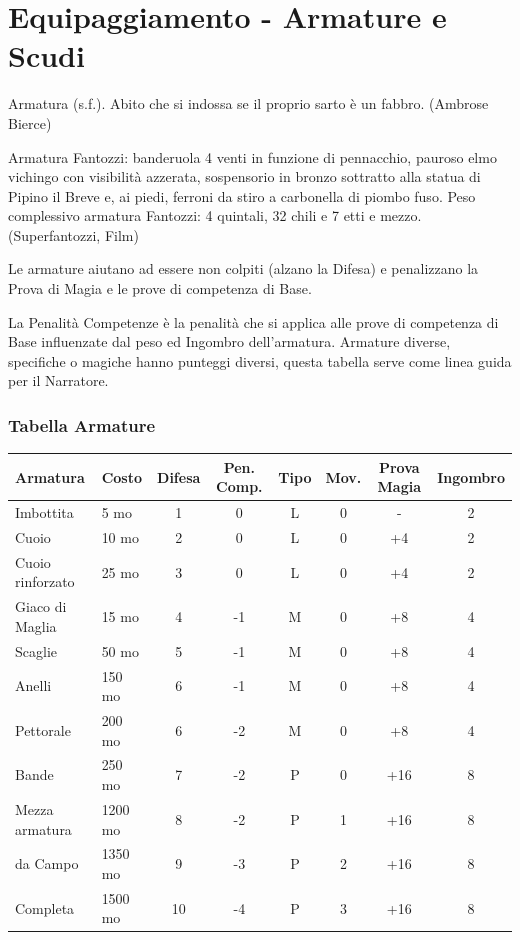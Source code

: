\section{Equipaggiamento - Armature e Scudi} \hypertarget{equipaggiamento.armature.scudi}{}\label{equipaggiamentoarmature}\hypertarget{equipaggiamentoarmature}{}

\label{equipaggiamento---armature-e-scudi}

\begin{enfasi}{
Armatura (s.f.). Abito che si indossa se il proprio sarto è un fabbro. (Ambrose Bierce)

\medskip

Armatura Fantozzi: banderuola 4 venti in funzione di pennacchio, pauroso elmo vichingo con visibilità azzerata, sospensorio in bronzo sottratto alla statua di Pipino il Breve e, ai piedi, ferroni da stiro a carbonella di piombo fuso. Peso complessivo armatura Fantozzi: 4 quintali, 32 chili e 7 etti e mezzo. (Superfantozzi, Film)} \end{enfasi}

Le armature aiutano ad essere non colpiti (alzano la Difesa) e penalizzano la Prova di Magia e le prove di competenza di Base.

La Penalità Competenze è la penalità che si applica alle prove di competenza di Base influenzate dal peso ed Ingombro dell'armatura. Armature diverse, specifiche o magiche hanno punteggi diversi, questa tabella serve come linea guida per il Narratore.

\subsubsection{Tabella Armature}

\label{tabella-armature}
\noindent\begin{tabularx}{\linewidth}{llcccccc}
	\toprule
\rowcolor{gray!20}\textbf{Armatura} & \textbf{Costo} & \textbf{Difesa} & \textbf{Pen. Comp.} & \textbf{Tipo} & \textbf{Mov.} & \textbf{Prova Magia}&\textbf{Ingombro}\\
\toprule
Imbottita & 5 mo & 1 & 0 & L 	& 		0 		& -		&2\\
\rowcolor{gray!20}Cuoio & 10 mo & 2 & 0 & L 		& 		0 		& +4		&2\\
Cuoio rinforzato& 25 mo& 3 & 0& L 	& 0 		& +4		&2\\
\rowcolor{gray!20}Giaco di Maglia & 15 mo & 4 & -1 & M & 0 		&+8			&4\\
Scaglie& 50 mo & 5& -1& M & 0 					&+8			&4\\
\rowcolor{gray!20}Anelli & 150 mo & 6& -1& M & 0 					&+8			&4\\
Pettorale& 200 mo & 6& -2& M & 0 				&+8			&4\\
\rowcolor{gray!20}Bande & 250 mo & 7& -2& P & 0 					&+16		&8\\
Mezza armatura& 1200 mo& 8& -2& P & 1 			&+16		&8\\
\rowcolor{gray!20}da Campo& 1350 mo& 9& -3& P & 2 				&+16		&8\\
Completa& 1500 mo& 10 & -4& P & 3 				&+16		&8
\end{tabularx}

